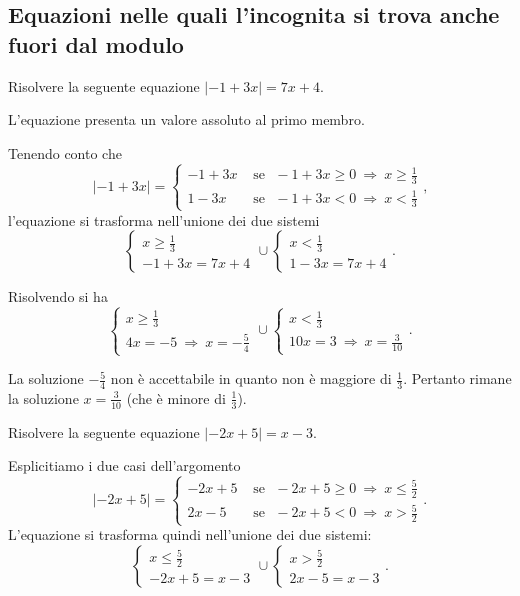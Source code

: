 \subsection{Equazioni nelle quali l'incognita si trova anche fuori dal modulo}
\begin{exrig}
\begin{esempio}
Risolvere la seguente equazione $\left|-1+3x\right|=7x+4$.

L'equazione presenta un valore assoluto al primo membro.

Tenendo conto che 
\[\left|-1+3x\right|=\begin{cases}-1+3x & \text{ se~~}-1+3x\ge 0\:\Rightarrow\: x\ge \frac 1 3\\1-3x & \text{ se~~}-1+3x<0\:\Rightarrow\: x<\frac 1 3\end{cases}\text{,}\]
l'equazione si trasforma nell'unione dei due sistemi 
\[\left\{\begin{array}{l}{x\ge \frac 1 3}\\{-1+3x=7x+4}\end{array}\right.\cup \left\{\begin{array}{l}{x<\frac 1 3}\\{1-3x=7x+4}\end{array}\right..\]

Risolvendo si ha 
\[\left\{\begin{array}{l}{x\ge \frac 1 3}\\{4x=-5\:\Rightarrow\: x=-\frac 5 4}\end{array}\right.\cup \left\{\begin{array}{l}{x<\frac 1 3}\\{10x=3\:\Rightarrow\: x=\frac 3{10}}\end{array}\right..\]

La soluzione $-\frac 5 4$ non è accettabile in quanto non è maggiore di $\frac 1 3$. Pertanto rimane la soluzione $x=\frac 3{10}$ (che è minore di $\frac{1}{3}$).
\end{esempio}

\begin{esempio}
Risolvere la seguente equazione $\left|-2x+5\right|=x-3$.

Esplicitiamo i due casi dell'argomento 
\[\left|-2x+5\right|=\begin{cases}-2x+5 & \text{ se~~}-2x+5\ge 0\:\Rightarrow\: x\le \frac 5 2\\2x-5 & \text{ se~~}-2x+5<0\:\Rightarrow\: x>\frac 5 2\end{cases}.\]
L'equazione si trasforma quindi nell'unione dei due sistemi:
\[\left\{\begin{array}{l}{x\le \frac 5 2}\\{-2x+5=x-3}\end{array}\right.\cup \left\{\begin{array}{l}{x>\frac 5 2}\\{2x-5=x-3}\end{array}\right..\]


\end{esempio}
\end{exrig}
